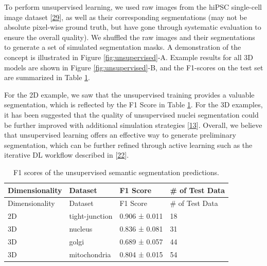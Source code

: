 To perform unsupervised learning, we used raw images from the hiPSC single-cell image dataset {[}\protect\hyperlink{ref-5sGcmDuy}{29}{]}, as well as their corresponding segmentations (may not be absolute pixel-wise ground truth, but have gone through systematic evaluation to ensure the overall quality). We shuffled the raw images and their segmentations to generate a set of simulated segmentation masks. A demonstration of the concept is illustrated in Figure \ref{fig:unsupervised}-A. Example results for all 3D models are shown in Figure \ref{fig:unsupervised}-B, and the F1-scores on the test set are summarized in Table \ref{tbl:unsuper}.

For the 2D example, we saw that the unsupervised training provides a valuable segmentation, which is reflected by the F1 Score in Table \ref{tbl:unsuper}. For the 3D examples, it has been suggested that the quality of unsupervised nuclei segmentation could be further improved with additional simulation strategies {[}\protect\hyperlink{ref-RuFP3CS3}{13}{]}. Overall, we believe that unsupervised learning offers an effective way to generate preliminary segmentation, which can be further refined through active learning such as the iterative DL workflow described in {[}\protect\hyperlink{ref-jM3v1UjQ}{22}{]}.

\begin{longtable}[]{@{}llll@{}}
\caption{F1 scores of the unsupervised semantic segmentation predictions. \label{tbl:unsuper}}\label{tbl:unsuper}\tabularnewline
\toprule()
Dimensionality & Dataset & F1 Score & \# of Test Data \\
\midrule()
\endfirsthead
\toprule()
Dimensionality & Dataset & F1 Score & \# of Test Data \\
\midrule()
\endhead
2D & tight-junction & 0.906 ± 0.011 & 18 \\
3D & nucleus & 0.836 ± 0.081 & 31 \\
3D & golgi & 0.689 ± 0.057 & 44 \\
3D & mitochondria & 0.804 ± 0.015 & 54 \\
\bottomrule()
\end{longtable}

